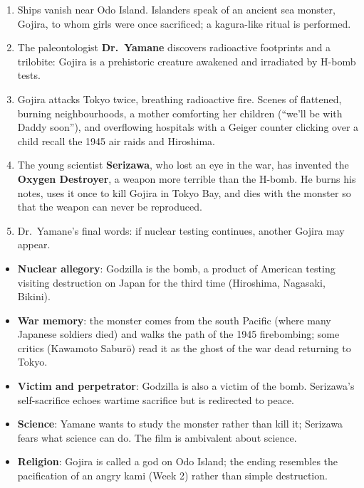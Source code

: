 \begin{enumerate}
  \item Ships vanish near Odo Island. Islanders speak of an ancient sea monster, Gojira,
        to whom girls were once sacrificed; a kagura-like ritual is performed.
  \item The paleontologist \textbf{Dr.\ Yamane} discovers radioactive footprints and a
        trilobite: Gojira is a prehistoric creature awakened and irradiated by H-bomb
        tests.
  \item Gojira attacks Tokyo twice, breathing radioactive fire. Scenes of flattened,
        burning neighbourhoods, a mother comforting her children (``we'll be with Daddy
        soon''), and overflowing hospitals with a Geiger counter clicking over a child
        recall the 1945 air raids and Hiroshima.
  \item The young scientist \textbf{Serizawa}, who lost an eye in the war, has invented the
        \textbf{Oxygen Destroyer}, a weapon more terrible than the H-bomb. He burns his
        notes, uses it once to kill Gojira in Tokyo Bay, and dies with the monster so that
        the weapon can never be reproduced.
  \item Dr.\ Yamane's final words: if nuclear testing continues, another Gojira may appear.
\end{enumerate}

\begin{important}
\begin{itemize}
  \item \textbf{Nuclear allegory}: Godzilla is the bomb, a product of American testing
        visiting destruction on Japan for the third time (Hiroshima, Nagasaki, Bikini).
  \item \textbf{War memory}: the monster comes from the south Pacific (where many Japanese
        soldiers died) and walks the path of the 1945 firebombing; some critics (Kawamoto
        Saburō) read it as the ghost of the war dead returning to Tokyo.
  \item \textbf{Victim and perpetrator}: Godzilla is also a victim of the bomb. Serizawa's
        self-sacrifice echoes wartime sacrifice but is redirected to peace.
  \item \textbf{Science}: Yamane wants to study the monster rather than kill it; Serizawa
        fears what science can do. The film is ambivalent about science.
  \item \textbf{Religion}: Gojira is called a god on Odo Island; the ending resembles the
        pacification of an angry kami (Week 2) rather than simple destruction.
\end{itemize}
\end{important}

